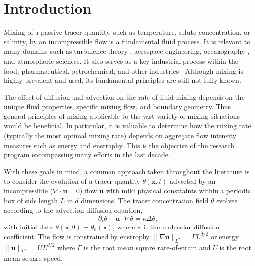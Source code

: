 \documentclass[12pt]{iopart}
\newcommand{\ltwo}[1]{\|#1\|_{L^{2}}}
\renewcommand{\vec}[1]{\mathbf{#1}}
\renewcommand{\u}{\mathbf{u}}
\newcommand{\ppt}[1]{\partial_{t} #1}
\newcommand{\lap}{\Delta }
\begin{document}
%
% 
%

\section{Introduction}
\label{sec:introduction}

Mixing of a passive tracer quantity, such as temperature, solute concentration, or salinity, by an incompressible flow is a fundamental fluid process. It is relevant to many domains such as turbulence theory \cite{Dimotakis2005,Violeau2000a}, aerospace engineering, oceanography \cite{Wunsch2004}, and atmospheric sciences. It also serves as a key industrial process within the food, pharmaceutical, petrochemical, and other industries \cite{paul2004handbook}. Although mixing is highly prevalent and used, its fundamental principles are still not fully known.

The effect of diffusion and advection on the rate of fluid mixing depends on the unique fluid properties, specific mixing flow, and boundary geometry. Thus general principles of mixing applicable to the vast variety of mixing situations would be beneficial. In particular, it is valuable to determine how the mixing rate (typically the most optimal mixing rate) depends on aggregate flow intensity measures such as energy and enstrophy. This is the objective of the research program encompassing many efforts \cite{CS2013,GI2014,JLT2012,JFM2011, Miles2017a,  JLT2012, DF2014, GM2005,Cortelezzi2008} in the last decade. 

With these goals in mind, a common approach taken throughout the literature is to consider the evolution of a tracer quantity $\theta (\vec{x},t)$ advected by an incompressible ($\nabla \cdot\vec{u}=0$) flow $\vec{u}$ with mild physical constraints within a periodic box  of side length $L$ in $d$ dimensions. The tracer concentration field $\theta$ evolves according to the advection-diffusion equation,
\begin{equation}
	\label{eq:PDE_advection}
	\ppt{\theta}+\mathbf{u}\cdot \nabla \theta=\kappa \lap\theta,
\end{equation}
with initial data $\theta(\mathbf{x},0)=\theta_{0}(\mathbf{x})$, where $\kappa$ is the molecular diffusion coefficient. The flow is constrained by enstrophy $\ltwo{\nabla\u} = \Gamma L^{d/2}$ or energy $\ltwo{\u} = UL^{d/2}$ where $\Gamma$ is the root mean square rate-of-strain and $U$ is the root mean square speed. 
\end{document}

